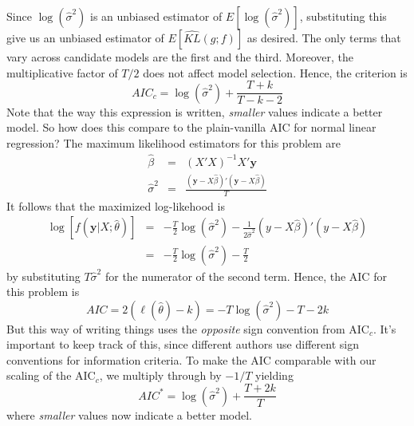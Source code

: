 \documentclass[12pt]{article}
\theoremstyle{definition}
\begin{document}
Since $\log(\widehat{\sigma}^2)$ is an unbiased estimator of $E[\log(\widehat{\sigma}^2)]$, substituting this give us an unbiased estimator of $E\left[\widehat{KL}(g;f) \right]$ as desired. 
The only terms that vary across candidate models are the first and the third. Moreover, the multiplicative factor of $T/2$ does not affect model selection. Hence, the criterion is
	$$AIC_c = \log(\widehat{\sigma}^2) + \frac{T + k}{T - k -2}$$
Note that the way this expression is written, \emph{smaller} values indicate a better model. So how does this compare to the plain-vanilla AIC for normal linear regression? The maximum likelihood estimators for this problem are
\begin{eqnarray*}
	\widehat{\beta} &=& (X'X)^{-1}X'\mathbf{y}\\
	\widehat{\sigma}^2 &=& \frac{(\mathbf{y} - X\widehat{\beta})'(\mathbf{y} - X\widehat{\beta})}{T}
\end{eqnarray*}
It follows that the maximized log-likehood is
\begin{eqnarray*}
	\log\left[f(\mathbf{y}|X;\widehat{\theta})\right] &=&  -\frac{T}{2} \log(\widehat{\sigma}^2) - \frac{1}{2\widehat{\sigma}^2}(y - X\widehat{\beta})'(y -X\widehat{\beta})\\
		&=& -\frac{T}{2} \log(\widehat{\sigma}^2) - \frac{T}{2}
\end{eqnarray*}
by substituting $T\widehat{\sigma}^2$ for the numerator of the second term. Hence, the AIC for this problem is 
	$$AIC = 2\left(\ell(\widehat{\theta}) - k \right) = -T\log(\widehat{\sigma}^2) - T - 2k $$
But this way of writing things uses the \emph{opposite} sign convention from AIC$_c$. It's important to keep track of this, since different authors use different sign conventions for information criteria. To make the AIC comparable with our scaling of the AIC$_c$, we multiply through by $-1/T$ yielding
	$$AIC^* = \log(\widehat{\sigma}^2) + \frac{T + 2k}{T}$$
where \emph{smaller} values now indicate a better model. 
\end{document}
